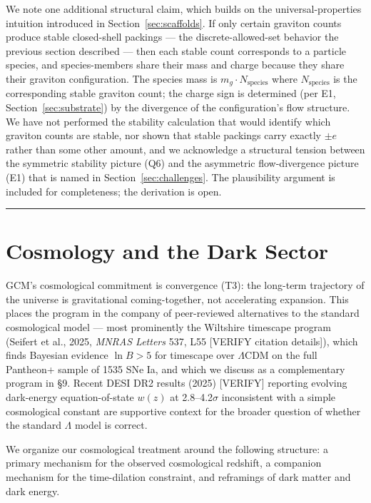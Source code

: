 \documentclass[12pt]{article}
\theoremstyle{definition}
\theoremstyle{remark}
\begin{document}
We note one additional structural claim, which builds on the
universal-properties intuition introduced in Section~\ref{sec:scaffolds}.
If only certain graviton counts produce stable closed-shell packings ---
the discrete-allowed-set behavior the previous section described --- then
each stable count corresponds to a particle species, and species-members
share their mass and charge because they share their graviton
configuration. The species mass is \(m_g \cdot N_{\text{species}}\) where
\(N_{\text{species}}\) is the corresponding stable graviton count; the
charge sign is determined (per E1, Section~\ref{sec:substrate}) by the
divergence of the configuration's flow structure. We have not performed
the stability calculation that would identify which graviton counts are
stable, nor shown that stable packings carry exactly \(\pm e\) rather
than some other amount, and we acknowledge a structural tension between
the symmetric stability picture (Q6) and the asymmetric flow-divergence
picture (E1) that is named in Section~\ref{sec:challenges}. The
plausibility argument is included for completeness; the derivation is
open.

\begin{center}\rule{0.5\linewidth}{0.5pt}\end{center}

\section{Cosmology and the Dark Sector}\label{sec:cosmology}

GCM's cosmological commitment is convergence (T3): the long-term
trajectory of the universe is gravitational coming-together, not
accelerating expansion. This places the program in the company of
peer-reviewed alternatives to the standard cosmological model --- most
prominently the Wiltshire timescape program (Seifert et al., 2025,
\emph{MNRAS Letters} 537, L55 {[}VERIFY citation details{]}), which
finds Bayesian evidence \(\ln B > 5\) for timescape over \(\Lambda\)CDM
on the full Pantheon+ sample of 1535 SNe Ia, and which we discuss as a
complementary program in §9. Recent DESI DR2 results (2025) {[}VERIFY{]}
reporting evolving dark-energy equation-of-state \(w(z)\) at
2.8--4.2\(\sigma\) inconsistent with a simple cosmological constant are
supportive context for the broader question of whether the standard
\(\Lambda\) model is correct.

We organize our cosmological treatment around the following structure: a
primary mechanism for the observed cosmological redshift, a companion
mechanism for the time-dilation constraint, and reframings of dark
matter and dark energy.
\end{document}
